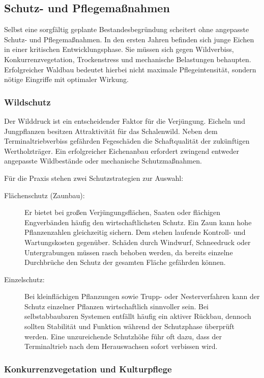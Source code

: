 \documentclass[twocolumn, bibliography=totoc, abstract=true]{scrartcl}
\begin{document}
\subsection{Schutz- und Pflegemaßnahmen}

Selbst eine sorgfältig geplante Bestandesbegründung scheitert ohne angepasste Schutz- und Pflegemaßnahmen. In den ersten Jahren befinden sich junge Eichen in einer kritischen Entwicklungsphase. Sie müssen sich gegen Wildverbiss, Konkurrenzvegetation, Trockenstress und mechanische Belastungen behaupten. Erfolgreicher Waldbau bedeutet hierbei nicht maximale Pflegeintensität, sondern nötige Eingriffe mit optimaler Wirkung.

\subsubsection{Wildschutz}

Der Wilddruck ist ein entscheidender Faktor für die Verjüngung. Eicheln und Jungpflanzen besitzen Attraktivität für das Schalenwild. Neben dem Terminaltriebverbiss gefährden Fegeschäden die Schaftqualität der zukünftigen Wertholzträger. Ein erfolgreicher Eichenanbau erfordert zwingend entweder angepasste Wildbestände oder mechanische Schutzmaßnahmen.

Für die Praxis stehen zwei Schutzstrategien zur Auswahl:
\begin{description}
\item[Flächenschutz (Zaunbau):] Er bietet bei großen Verjüngungsflächen, Saaten oder flächigen Engverbänden häufig den wirtschaftlichsten Schutz. Ein Zaun kann hohe Pflanzenzahlen gleichzeitig sichern. Dem stehen laufende Kontroll- und Wartungskosten gegenüber. Schäden durch Windwurf, Schneedruck oder Untergrabungen müssen rasch behoben werden, da bereits einzelne Durchbrüche den Schutz der gesamten Fläche gefährden können.
\item[Einzelschutz:] Bei kleinflächigen Pflanzungen sowie Trupp- oder Nesterverfahren kann der Schutz einzelner Pflanzen wirtschaftlich sinnvoller sein. Bei selbstabbaubaren Systemen entfällt häufig ein aktiver Rückbau, dennoch sollten Stabilität und Funktion während der Schutzphase überprüft werden. Eine unzureichende Schutzhöhe führ oft dazu, dass der Terminaltrieb nach dem Herauswachsen sofort verbissen wird.
\end{description}

\subsubsection{Konkurrenzvegetation und Kulturpflege}
\end{document}
